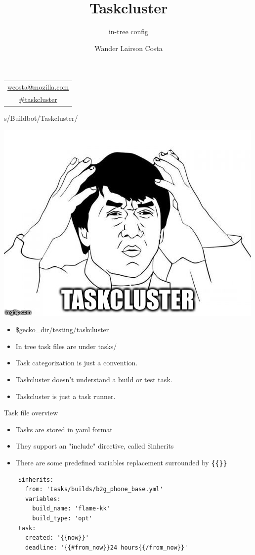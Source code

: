 \documentclass[pdf]{beamer}
\title[Taskcluster in-tree]{Taskcluster}
\subtitle{in-tree config}
\author{{\Large Wander Lairson Costa}}
\institute{{\large Taskcluster team}}
\date{}
\begin{document}
\begin{frame}
  \titlepage
  \begin{center}
    \begin{tabular}{c}
      \href{mailto:wcosta@mozilla.com}{wcosta@mozilla.com} \\
      \url{\#taskcluster} \\
    \end{tabular}
  \end{center}
\end{frame}

\begin{frame}{s/Buildbot/Taskcluster/}
  \begin{center}
    \includegraphics[scale=0.25]{img/wth.jpg}
  \end{center}
  \begin{itemize}
    \item \$gecko\_dir/testing/taskcluster
    \item In tree task files are under tasks/
    \item Task categorization is just a convention.
    \item Taskcluster doesn't understand a build or test task.
    \item Taskcluster is just a task runner.
  \end{itemize}
\end{frame}

\begin{frame}[fragile]{Task file overview}
  \begin{itemize}
    \item Tasks are stored in yaml format
    \item They support an "include" directive, called \$inherits
    \item There are some predefined variables replacement surrounded by \textbf{\{\{\}\}}
  \end{itemize}
  \footnotesize
  \begin{lstlisting}
    $inherits:
      from: 'tasks/builds/b2g_phone_base.yml'
      variables:
        build_name: 'flame-kk'
        build_type: 'opt'
    task:
      created: '{{now}}'
      deadline: '{{#from_now}}24 hours{{/from_now}}'
  \end{lstlisting}
\end{frame}
\end{document}

